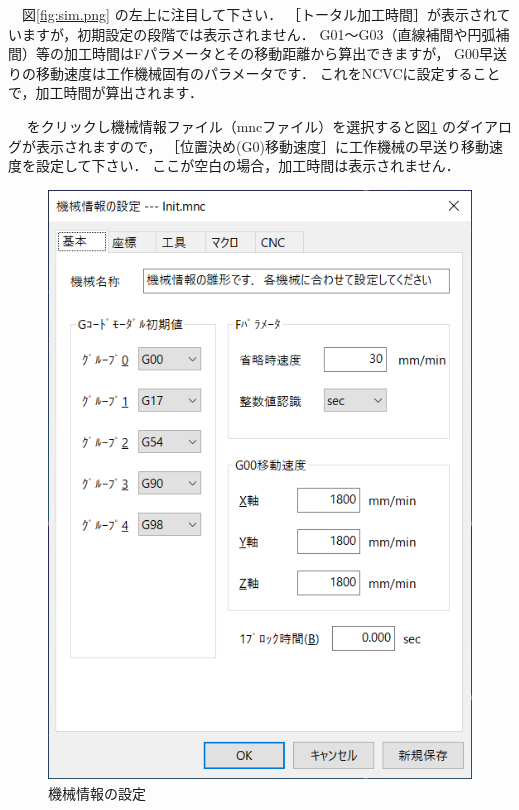 \begin{minipage}[t]{0.5\textwidth}
　図\ref{fig:sim.png} の左上に注目して下さい．
［トータル加工時間］が表示されていますが，初期設定の段階では表示されません．
G01～G03（直線補間や円弧補間）等の加工時間はFパラメータとその移動距離から算出できますが，
G00早送りの移動速度は工作機械固有のパラメータです．
これをNCVCに設定することで，加工時間が算出されます．

　 をクリックし機械情報ファイル（mncファイル）を選択すると図\ref{fig:kikai.png} のダイアログが表示されますので，
［位置決め(G0)移動速度］に工作機械の早送り移動速度を設定して下さい．
ここが空白の場合，加工時間は表示されません．
\end{minipage}
\begin{minipage}[t]{0.5\textwidth}
\vspace*{-2zh}
\begin{figure}[H]
\centering
\includegraphics[scale=0.7]{No2/fig/kikai.png}
\caption{機械情報の設定}
\label{fig:kikai.png}
\end{figure}
\end{minipage}

